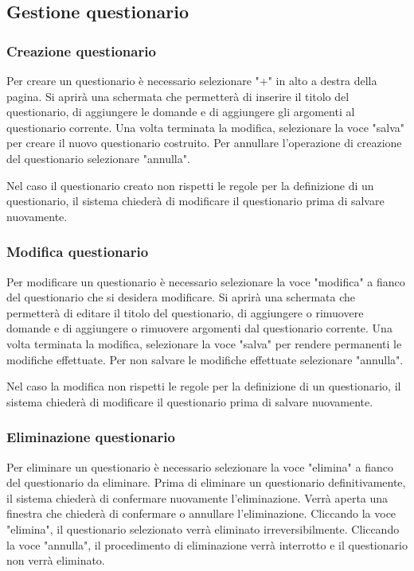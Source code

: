 \documentclass[12pt,a4paper]{article}
\begin{document}
		\subsection{Gestione questionario}
		\subsubsection{Creazione questionario}
		Per creare un questionario è necessario selezionare "+" in alto a destra della pagina. Si aprirà una schermata che permetterà di inserire il titolo del questionario, di aggiungere le domande e di aggiungere gli argomenti al questionario corrente.
		Una volta terminata la modifica, selezionare la voce "salva" per creare il nuovo questionario costruito. 
		Per annullare l'operazione di creazione del questionario selezionare "annulla".
		
		Nel caso il questionario creato non rispetti le regole per la definizione di un questionario, il sistema chiederà di modificare il questionario prima di salvare nuovamente.
		
		\subsubsection{Modifica questionario}
		Per modificare un questionario è necessario selezionare la voce "modifica" a fianco del questionario che si desidera modificare. Si aprirà una schermata che permetterà di editare il titolo del questionario, di aggiungere o rimuovere domande e di aggiungere o rimuovere argomenti dal questionario corrente.
		Una volta terminata la modifica, selezionare la voce "salva" per rendere permanenti le modifiche effettuate. Per non salvare le modifiche effettuate selezionare "annulla".
			
		Nel caso la modifica non rispetti le regole per la definizione di un questionario, il sistema chiederà di modificare il questionario prima di salvare nuovamente.
			
		\subsubsection{Eliminazione questionario}
		Per eliminare un questionario è necessario selezionare la voce "elimina" a fianco del questionario da eliminare. Prima di eliminare un questionario definitivamente, il sistema chiederà di confermare nuovamente l'eliminazione.
		Verrà aperta una finestra che chiederà di confermare o annullare l'eliminazione. Cliccando la voce "elimina", il questionario selezionato verrà eliminato irreversibilmente. Cliccando la voce "annulla", il procedimento di eliminazione verrà interrotto e il questionario non verrà eliminato.
\end{document}
